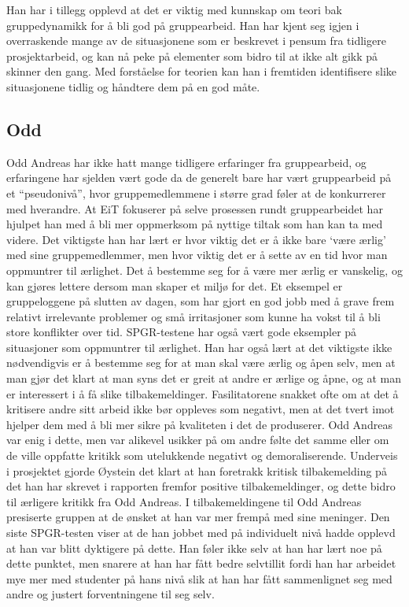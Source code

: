 \documentclass[a4paper,norsk,oneside]{article}
\begin{document}
Han har i tillegg opplevd at det er viktig med kunnskap om teori bak gruppedynamikk for å bli god på gruppearbeid. Han har kjent seg igjen i overraskende mange av de situasjonene som er beskrevet i pensum fra tidligere prosjektarbeid, og kan nå peke på elementer som bidro til at ikke alt gikk på skinner den gang. Med forståelse for teorien kan han i fremtiden identifisere slike situasjonene tidlig og håndtere dem på en god måte.

\subsection{Odd} 
Odd Andreas har ikke hatt mange tidligere erfaringer fra gruppearbeid, og erfaringene har sjelden vært gode da de generelt bare har vært gruppearbeid på et “pseudonivå”, hvor gruppemedlemmene i større grad føler at de konkurrerer med hverandre. At EiT fokuserer på selve prosessen rundt gruppearbeidet har hjulpet han med å bli mer oppmerksom på nyttige tiltak som han kan ta med videre.
Det viktigste han har lært er hvor viktig det er å ikke bare ‘være ærlig’ med sine gruppemedlemmer, men hvor viktig det er å sette av en tid hvor man oppmuntrer til ærlighet. Det å bestemme seg for å være mer ærlig er vanskelig, og kan gjøres lettere dersom man skaper et miljø for det. Et eksempel er gruppeloggene på slutten av dagen, som har gjort en god jobb med å grave frem relativt irrelevante problemer og små irritasjoner som kunne ha vokst til å bli store konflikter over tid. SPGR-testene har også vært gode eksempler på situasjoner som oppmuntrer til ærlighet. Han har også lært at det viktigste ikke nødvendigvis er å bestemme seg for at man skal være ærlig og åpen selv, men at man gjør det klart at man syns det er greit at andre er ærlige og åpne, og at man er interessert i å få slike tilbakemeldinger. Fasilitatorene snakket ofte om at det å kritisere andre sitt arbeid ikke bør oppleves som negativt, men at det tvert imot hjelper dem med å bli mer sikre på kvaliteten i det de produserer. Odd Andreas var enig i dette, men var alikevel usikker på om andre følte det samme eller om de ville oppfatte kritikk som utelukkende negativt og demoraliserende. Underveis i prosjektet gjorde Øystein det klart at han foretrakk kritisk tilbakemelding på det han har skrevet i rapporten fremfor positive tilbakemeldinger, og dette bidro til ærligere kritikk fra Odd Andreas.
I tilbakemeldingene til Odd Andreas presiserte gruppen at de ønsket at han var mer frempå med sine meninger. Den siste SPGR-testen viser at de han jobbet med på individuelt nivå hadde opplevd at han var blitt dyktigere på dette. Han føler ikke selv at han har lært noe på dette punktet, men snarere at han har fått bedre selvtillit fordi han har arbeidet mye mer med studenter på hans nivå slik at han har fått sammenlignet seg med andre og justert forventningene til seg selv.
\end{document}
